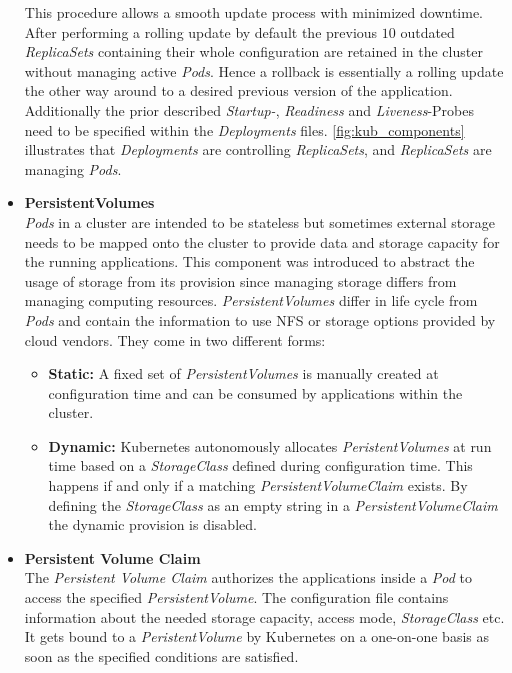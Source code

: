 \begin{itemize}
{    This procedure allows a smooth update process with minimized downtime.
    After performing a rolling update by default the previous $10$ outdated \textit{ReplicaSets} containing their whole configuration are retained in the cluster without managing active \textit{Pods}.
    Hence a rollback is essentially a rolling update the other way around to a desired previous version of the application.
    Additionally the prior described \textit{Startup-}, \textit{Readiness} and \textit{Liveness}-Probes need to be specified within the \textit{Deployments} files.
    \cref{fig:kub_components} illustrates that \textit{Deployments} are controlling \textit{ReplicaSets}, and \textit{ReplicaSets} are managing \textit{Pods}.
    }
    \item[]{\textbf{PersistentVolumes}\\
    \textit{Pods} in a cluster are intended to be stateless but sometimes external storage needs to be mapped onto the cluster to provide data and storage capacity for the running applications.
    This component was introduced to abstract the usage of storage from its provision since managing storage differs from managing computing resources. 
    \textit{PersistentVolumes} differ in life cycle from \textit{Pods} and contain the information to use NFS or storage options provided by cloud vendors.
    They come in two different forms:
    \begin{itemize}
        \item[] {\textbf{Static: }A fixed set of \textit{PersistentVolumes} is manually created at configuration time and can be consumed by applications within the cluster.}
        \item[] {\textbf{Dynamic: }Kubernetes autonomously allocates \textit{PeristentVolumes} at run time based on a \textit{StorageClass} defined during configuration time.
        This happens if and only if a matching \textit{PersistentVolumeClaim} exists.
        By defining the \textit{StorageClass} as an empty string in a \textit{PersistentVolumeClaim} the dynamic provision is disabled.}
    \end{itemize}
    }
    \item[]{\textbf{Persistent Volume Claim}\\
    The \textit{Persistent Volume Claim} authorizes the applications inside a \textit{Pod} to access the specified \textit{PersistentVolume}.
    The configuration file contains information about the needed storage capacity, access mode, \textit{StorageClass} etc.
    It gets bound to a \textit{PeristentVolume} by Kubernetes on a one-on-one basis as soon as the specified conditions are satisfied.
}
\end{itemize}
